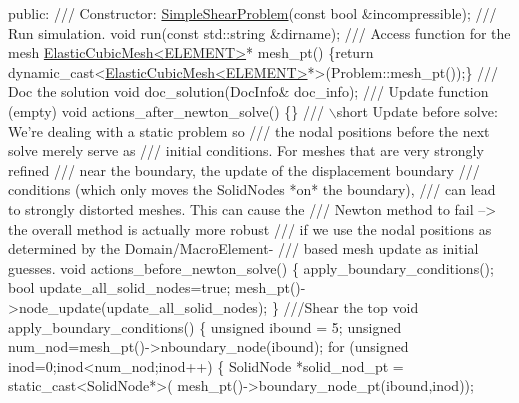 \begin{DoxyCodeInclude}
\textcolor{keyword}{public}:
\textcolor{comment}{}
\textcolor{comment}{ /// Constructor:}
\textcolor{comment}{} \hyperlink{classSimpleShearProblem}{SimpleShearProblem}(\textcolor{keyword}{const} \textcolor{keywordtype}{bool} &incompressible);
\textcolor{comment}{}
\textcolor{comment}{ /// Run simulation.}
\textcolor{comment}{} \textcolor{keywordtype}{void} run(\textcolor{keyword}{const} std::string &dirname);
 \textcolor{comment}{}
\textcolor{comment}{ /// Access function for the mesh}
\textcolor{comment}{} \hyperlink{classElasticCubicMesh}{ElasticCubicMesh<ELEMENT>}* mesh\_pt() 
  \{\textcolor{keywordflow}{return} \textcolor{keyword}{dynamic\_cast<}\hyperlink{classElasticCubicMesh}{ElasticCubicMesh<ELEMENT>}*\textcolor{keyword}{>}(Problem::mesh\_pt());\} 
\textcolor{comment}{}
\textcolor{comment}{ /// Doc the solution}
\textcolor{comment}{} \textcolor{keywordtype}{void} doc\_solution(DocInfo& doc\_info);
\textcolor{comment}{}
\textcolor{comment}{ /// Update function (empty)}
\textcolor{comment}{} \textcolor{keywordtype}{void} actions\_after\_newton\_solve() \{\}
\textcolor{comment}{}
\textcolor{comment}{ /// \(\backslash\)short Update before solve: We're dealing with a static problem so}
\textcolor{comment}{ /// the nodal positions before the next solve merely serve as}
\textcolor{comment}{ /// initial conditions. For meshes that are very strongly refined}
\textcolor{comment}{ /// near the boundary, the update of the displacement boundary}
\textcolor{comment}{ /// conditions (which only moves the SolidNodes *on* the boundary),}
\textcolor{comment}{ /// can lead to strongly distorted meshes. This can cause the}
\textcolor{comment}{ /// Newton method to fail --> the overall method is actually more robust}
\textcolor{comment}{ /// if we use the nodal positions as determined by the Domain/MacroElement-}
\textcolor{comment}{ /// based mesh update as initial guesses. }
\textcolor{comment}{} \textcolor{keywordtype}{void} actions\_before\_newton\_solve()
  \{ 
   apply\_boundary\_conditions();
   \textcolor{keywordtype}{bool} update\_all\_solid\_nodes=\textcolor{keyword}{true};
   mesh\_pt()->node\_update(update\_all\_solid\_nodes);
  \}   
\textcolor{comment}{}
\textcolor{comment}{ ///Shear the top}
\textcolor{comment}{} \textcolor{keywordtype}{void} apply\_boundary\_conditions()
  \{
   \textcolor{keywordtype}{unsigned} ibound = 5;
   \textcolor{keywordtype}{unsigned} num\_nod=mesh\_pt()->nboundary\_node(ibound);
   \textcolor{keywordflow}{for} (\textcolor{keywordtype}{unsigned} inod=0;inod<num\_nod;inod++)
    \{
     SolidNode *solid\_nod\_pt = \textcolor{keyword}{static\_cast<}SolidNode*\textcolor{keyword}{>}(
     mesh\_pt()->boundary\_node\_pt(ibound,inod));


\end{DoxyCodeInclude}
